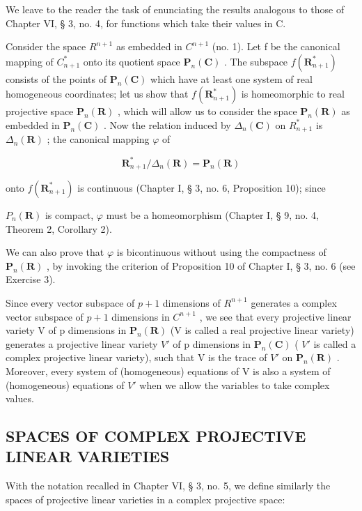 We leave to the reader the task of enunciating the results analogous to those of Chapter VI, § 3, no. 4, for functions which take their values in C.

Consider the space \(R^{n+1}\) as embedded in \(C^{n+1}\) (no. 1). Let f be the canonical mapping of \(C_{n+1}^{*}\) onto its quotient space \(\mathbf{P}_{n}(\mathbf{C})\) . The subspace \(f(\mathbf{R}_{n+1}^{*})\) consists of the points of \(\mathbf{P}_{n}(\mathbf{C})\) which have at least one system of real homogeneous coordinates; let us show that \(f(\mathbf{R}_{n+1}^{*})\) is homeomorphic to real projective space \(\mathbf{P}_{n}(\mathbf{R})\) , which will allow us to consider the space \(\mathbf{P}_{n}(\mathbf{R})\) as embedded in \(\mathbf{P}_{n}(\mathbf{C})\) . Now the relation induced by \(\Delta_{n}(\mathbf{C})\) on \(R_{n+1}^{*}\) is \(\Delta_{n}(\mathbf{R})\) ; the canonical mapping \(\varphi\) of

\[
\mathbf {R} _ {n + 1} ^ {*} / \Delta_ {n} (\mathbf {R}) = \mathbf {P} _ {n} (\mathbf {R})
\]

onto \(f(\mathbf{R}_{n+1}^*)\) is continuous (Chapter I, § 3, no. 6, Proposition 10); since

\(P_{n}(\mathbf{R})\) is compact, \(\varphi\) must be a homeomorphism (Chapter I, § 9, no. 4, Theorem 2, Corollary 2).

We can also prove that \(\varphi\) is bicontinuous without using the compactness of \(\mathbf{P}_n(\mathbf{R})\) , by invoking the criterion of Proposition 10 of Chapter I, § 3, no. 6 (see Exercise 3).

Since every vector subspace of \(p + 1\) dimensions of \(R^{n+1}\) generates a complex vector subspace of \(p + 1\) dimensions in \(C^{n+1}\) , we see that every projective linear variety V of p dimensions in \(\mathbf{P}_{n}(\mathbf{R})\) (V is called a real projective linear variety) generates a projective linear variety \(V'\) of p dimensions in \(\mathbf{P}_{n}(\mathbf{C})\) ( \(V'\) is called a complex projective linear variety), such that V is the trace of \(V'\) on \(\mathbf{P}_{n}(\mathbf{R})\) . Moreover, every system of (homogeneous) equations of V is also a system of (homogeneous) equations of \(V'\) when we allow the variables to take complex values.

\subsection{SPACES OF COMPLEX PROJECTIVE LINEAR VARIETIES}

With the notation recalled in Chapter VI, § 3, no. 5, we define similarly the spaces of projective linear varieties in a complex projective space:

